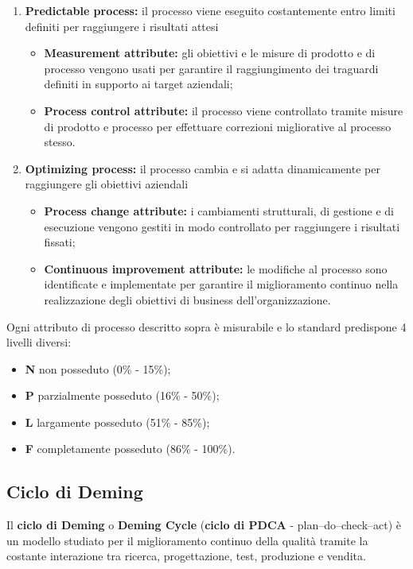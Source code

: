 \begin{flushleft}
\begin{enumerate}[label*=\arabic*]
	\item \textbf{Predictable process:} il processo viene eseguito costantemente entro limiti definiti per raggiungere i risultati attesi
		\begin{itemize}
			\item\textbf{Measurement attribute:} gli obiettivi e le misure di prodotto e di processo vengono usati per garantire il raggiungimento dei traguardi definiti in supporto ai target aziendali;
			\item \textbf{Process control attribute:} il processo viene controllato tramite misure di prodotto e processo per effettuare correzioni migliorative al processo stesso.
		\end{itemize}
		
\item \textbf{Optimizing process:} il processo cambia e si adatta dinamicamente per raggiungere gli obiettivi aziendali
		\begin{itemize}
			\item \textbf{Process change attribute:} i cambiamenti strutturali, di gestione e di esecuzione vengono gestiti in modo controllato per raggiungere i risultati fissati;
			\item \textbf{Continuous improvement attribute:} le modifiche al processo sono identificate e implementate per garantire il miglioramento continuo nella realizzazione degli obiettivi di business dell'organizzazione.
		\end{itemize}

\end{enumerate}

Ogni attributo di processo descritto sopra è misurabile e lo standard predispone 4 livelli diversi:
\begin{itemize}[label={}]
	\item \textbf{N} non posseduto (0\% - 15\%);
	\item \textbf{P} parzialmente posseduto (16\% - 50\%);
	\item \textbf{L} largamente posseduto (51\% - 85\%);
	\item \textbf{F} completamente posseduto (86\% - 100\%).
\end{itemize}

\subsection{Ciclo di Deming}

Il \textbf{ciclo di Deming} o \textbf{Deming Cycle} (\textbf{ciclo di PDCA} - plan–do–check–act) è un modello studiato per il miglioramento continuo della qualità tramite la costante interazione tra ricerca, progettazione, test, produzione e vendita.


\end{flushleft}
